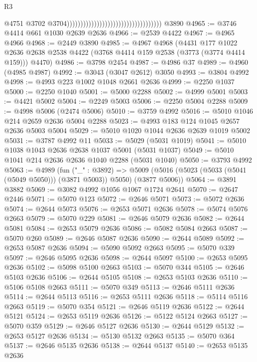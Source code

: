 \begin{lexlean}{R3}
\begin{coremodule}
                                                                          @4751
                                                                          @3702
                                                                          @3704)))))))))))))))))))))))))))))))))))
    @3890
@4965 := @3746 @4414 @661 @1030 @2639 @2636
@4966 := @2539 @4422
@4967 := @4965 @4966
@4968 := @2449 @3890
@4985 := @4967
    @4968
    (@4431
      @177
      @1022
      @2636
      @2638
      @2538
      @4422
      (@3768 @4414 @159 @2538 (@3773 (@3774 @4414 @159)))
      @4470)
@4986 := @3798 @2454
@4987 := @4986 @37
@4989 := @4960 (@4985 @4987)
@4992 := @3043 (@3047 @2612) @3050
@4993 := @3804 @4992
@4998 := @4993 @223 @1002 @1048 @2661 @2636
@4999 := @2250 @1037
@5000 := @2250 @1040
@5001 := @5000 @2288
@5002 := @4999 @5001
@5003 := @4421 @5002
@5004 := @2249 @5003
@5006 := @2250 @5004 @2288
@5009 := @4998 @5006 (@2474 @5006)
@5010 := @3759 @4992
@5016 := @5010 @1046 @214 @2659 @2636 @5004 @2288
@5023 := @4993 @183 @124 @1045 @2657 @2636 @5003 @5004
@5029 := @5010 @1020 @1044 @2636 @2639 @1019 @5002
@5031 := @3787 @4992 @11
@5033 := @5029 (@5031 @1019)
@5041 := @5010 @1038 @1043 @2636 @2638 @1037 @5001 (@5031 @1037)
@5049 := @5010 @1041 @214 @2636 @2636 @1040 @2288 (@5031 @1040)
@5050 := @3793 @4992
@5063 := @4989
    (fun ("_" : @3892) =>
    @5009 (@5016 (@5023 (@5033 (@5041 (@5049 @5050))) (@3871 @5003)) @5050) (@3877 @5006))
@5064 := @3891 @3882
@5069 := @3082 @4992 @1056 @1067 @1724 @2641
@5070 := @2647 @2446
@5071 := @5070 @123
@5072 := @2646 @5071
@5073 := @5072 @2636
@5074 := @2644 @5073
@5076 := @2653 @5071 @2636
@5078 := @5074 @5076 @2663
@5079 := @5070 @229
@5081 := @2646 @5079 @2636
@5082 := @2644 @5081
@5084 := @2653 @5079 @2636
@5086 := @5082 @5084 @2663
@5087 := @5070 @260
@5089 := @2646 @5087 @2636
@5090 := @2644 @5089
@5092 := @2653 @5087 @2636
@5094 := @5090 @5092 @2663
@5095 := @5070 @339
@5097 := @2646 @5095 @2636
@5098 := @2644 @5097
@5100 := @2653 @5095 @2636
@5102 := @5098 @5100 @2663
@5103 := @5070 @344
@5105 := @2646 @5103 @2636
@5106 := @2644 @5105
@5108 := @2653 @5103 @2636
@5110 := @5106 @5108 @2663
@5111 := @5070 @349
@5113 := @2646 @5111 @2636
@5114 := @2644 @5113
@5116 := @2653 @5111 @2636
@5118 := @5114 @5116 @2663
@5119 := @5070 @354
@5121 := @2646 @5119 @2636
@5122 := @2644 @5121
@5124 := @2653 @5119 @2636
@5126 := @5122 @5124 @2663
@5127 := @5070 @359
@5129 := @2646 @5127 @2636
@5130 := @2644 @5129
@5132 := @2653 @5127 @2636
@5134 := @5130 @5132 @2663
@5135 := @5070 @364
@5137 := @2646 @5135 @2636
@5138 := @2644 @5137
@5140 := @2653 @5135 @2636

\end{coremodule}
\end{lexlean}

